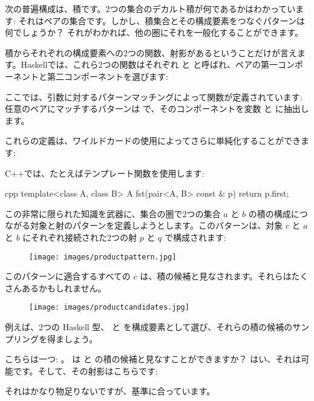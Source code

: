次の普遍構成は、積です。2つの集合のデカルト積が何であるかはわかっています: それはペアの集合です。しかし、積集合とその構成要素をつなぐパターンは何でしょうか？ それがわかれば、他の圏にそれを一般化することができます。

積からそれぞれの構成要素への2つの関数、射影があるということだけが言えます。Haskellでは、これら2つの関数はそれぞれ  と  と呼ばれ、ペアの第一コンポーネントと第二コンポーネントを選びます:


ここでは、引数に対するパターンマッチングによって関数が定義されています: 任意のペアにマッチするパターンは  で、そのコンポーネントを変数  と  に抽出します。

これらの定義は、ワイルドカードの使用によってさらに単純化することができます: 

C++では、たとえばテンプレート関数を使用します: 

\begin{snip}{cpp}
template<class A, class B> A
fst(pair<A, B> const & p) {
    return p.first;
}
\end{snip}
この非常に限られた知識を武器に、集合の圏で2つの集合 $a$ と $b$ の積の構成につながる対象と射のパターンを定義しようとします。このパターンは、対象 $c$ と $a$ と $b$ にそれぞれ接続された2つの射 $p$ と $q$ で構成されます: 


\begin{figure}[H]
  \centering
  \texttt{[image: images/productpattern.jpg]}
\end{figure}

\noindent
このパターンに適合するすべての $c$ は、積の候補と見なされます。それらはたくさんあるかもしれません。

\begin{figure}[H]
  \centering
  \texttt{[image: images/productcandidates.jpg]}
\end{figure}

\noindent
例えば、2つの Haskell 型、 と  を構成要素として選び、それらの積の候補のサンプリングを得ましょう。

こちらは一つ: 。  は  と  の積の候補と見なすことができますか？ はい、それは可能です。そして、その射影はこちらです: 

それはかなり物足りないですが、基準に合っています。

